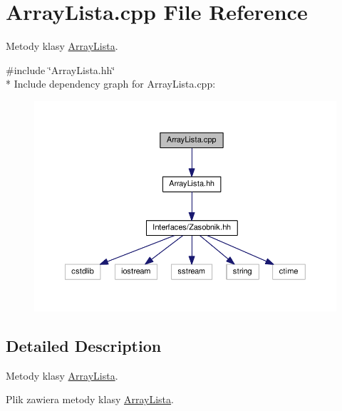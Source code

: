 \hypertarget{a00031}{}\section{Array\+Lista.\+cpp File Reference}
\label{a00031}


Metody klasy \hyperlink{a00008}{Array\+Lista}.  


{\ttfamily \#include \char`\"{}Array\+Lista.\+hh\char`\"{}}\\*
Include dependency graph for Array\+Lista.\+cpp\+:
\nopagebreak
\begin{figure}[H]
\begin{center}
\leavevmode
\includegraphics[width=350pt]{a00073}
\end{center}
\end{figure}


\subsection{Detailed Description}
Metody klasy \hyperlink{a00008}{Array\+Lista}. 

Plik zawiera metody klasy \hyperlink{a00008}{Array\+Lista}. 